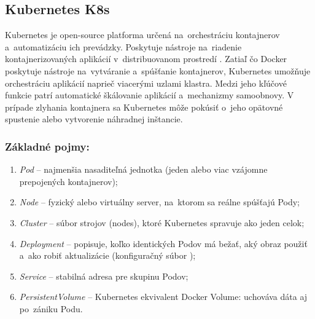 \subsection{Kubernetes K8s}
Kubernetes je open-source platforma určená na~orchestráciu kontajnerov a~automatizáciu 
ich prevádzky. Poskytuje nástroje na~riadenie kontajnerizovaných aplikácií 
v~distribuovanom prostredí \cite{kubernetes}. Zatiaľ čo Docker poskytuje nástroje 
na~vytváranie a~spúšťanie kontajnerov, Kubernetes umožňuje orchestráciu aplikácií 
naprieč viacerými uzlami klastra. Medzi jeho kľúčové funkcie patrí automatické škálovanie 
aplikácií a~mechanizmy samoobnovy. V prípade zlyhania kontajnera sa Kubernetes 
môže pokúsiť o~jeho opätovné spustenie alebo vytvorenie náhradnej inštancie. 
\subsubsection*{Základné pojmy:}
\begin{enumerate}
  \item \emph{Pod} -- najmenšia nasaditeľná jednotka (jeden alebo viac
  vzájomne prepojených kontajnerov);
  \item \emph{Node} -- fyzický alebo virtuálny server, na~ktorom sa 
  reálne spúšťajú Pody;
  \item \emph{Cluster} -- súbor strojov (nodes), ktoré Kubernetes spravuje 
  ako jeden celok;
  \item \emph{Deployment} -- popisuje, koľko identických Podov má bežať, aký obraz 
  použiť a~ako robiť aktualizácie (konfiguračný súbor );
  \item \emph{Service} -- stabilná adresa pre skupinu Podov;
  \item \emph{PersistentVolume} -- Kubernetes ekvivalent Docker Volume: uchováva dáta 
  aj po~zániku Podu.
\end{enumerate}


